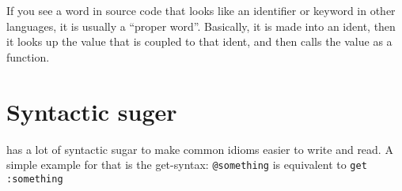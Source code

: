If you see a word in \dv{} source code that looks like an identifier or
keyword in other languages, it is usually a ``proper word''. Basically, it is made into an
ident, then it looks up the value that is coupled to that ident, and
then calls the value as a function.

\section{Syntactic suger}
\dv{} has a lot of syntactic sugar to make common idioms easier to write
and read. A simple example for that is the get-syntax: \verb!@something!
is equivalent to \verb!get :something!
